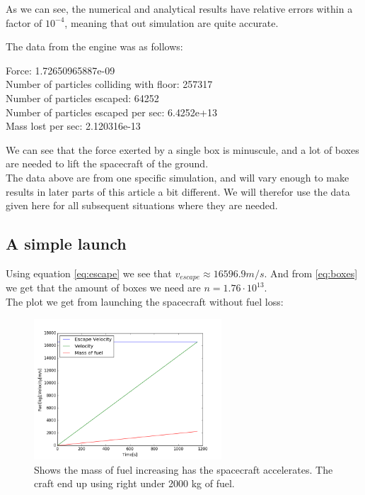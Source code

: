 \documentclass[a4paper, 10pt]{article}
\begin{document}
As we can see, the numerical and analytical results have relative errors within a factor of $10^{-4}$, meaning that out simulation are quite accurate.

The data from the engine was as follows:

\begin{tcolorbox}
Force:  1.72650965887e-09 \\
Number of particles colliding with floor:  257317 \\
Number of particles escaped:  64252 \\
Number of particles escaped per sec:  6.4252e+13 \\
Mass lost per sec:  2.120316e-13
\end{tcolorbox}

We can see that the force exerted by a single box is minuscule, and a lot of boxes are needed to lift the spacecraft of the ground. \\

The data above are from one specific simulation, and will vary enough to make results in later parts of this article a bit different. We will therefor use the data given here for all subsequent situations where they are needed.

\subsection{A simple launch}

Using equation \ref{eq:escape} we see that $v_{escape} \approx 16596.9 m/s$. And from \ref{eq:boxes} we get that the amount of boxes we need are $n = 1.76 \cdot 10^{13}$. \\

The plot we get from launching the spacecraft without fuel loss:


\begin{figure}[H]
\begin{center}
\includegraphics[width = 70mm]{part1launchConstMass.png}
\caption{Shows the mass of fuel increasing has the spacecraft accelerates. The craft end up using right under 2000 kg of fuel.}
\end{center}
\end{figure}
\end{document}
